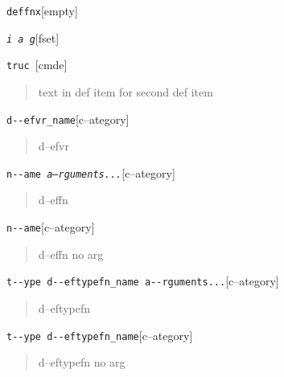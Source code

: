 \documentclass{book}
\begin{document}
\begin{titlepage}
%
\noindent\texttt{deffnx}\hfill[empty]



%

\noindent\texttt{\textsl{i} \EmbracOn{}\textnormal{\textsl{a g}}\EmbracOff{}}\hfill[fset]



%
\noindent\texttt{truc \EmbracOn{}\textnormal{\textsl{}}\EmbracOff{}}\hfill[cmde]



%
\begin{quote}
text in def item for second def item
\end{quote}


\noindent\texttt{d{-}{-}efvr\_name}\hfill[c--ategory]



%
\begin{quote}
d--efvr
\end{quote}

\noindent\texttt{n{-}{-}ame \EmbracOn{}\textnormal{\textsl{a--rguments...}}\EmbracOff{}}\hfill[c--ategory]



%
\begin{quote}
d--effn
\end{quote}

\noindent\texttt{n{-}{-}ame}\hfill[c--ategory]



%
\begin{quote}
d--effn no arg
\end{quote}

\noindent\texttt{t{-}{-}ype d{-}{-}eftypefn\_name a{-}{-}rguments...}\hfill[c--ategory]



%
\begin{quote}
d--eftypefn
\end{quote}

\noindent\texttt{t{-}{-}ype d{-}{-}eftypefn\_name}\hfill[c--ategory]



%
\begin{quote}
d--eftypefn no arg
\end{quote}


\end{titlepage}
\end{document}
